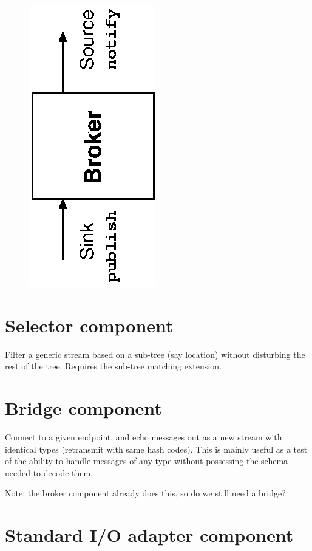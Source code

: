 \documentclass[12pt,a4paper,twoside]{article}
\renewcommand{\_}{\texttt{\symbol{95}}}
\begin{document}
\begin{figure}[ht]
\centering
\includegraphics[scale=1.0,angle=-90]{diagrams/broker.eps}
\end{figure}

\section{Selector component}

Filter a generic stream based on a sub-tree (say location)
without disturbing the rest of the tree. Requires the
sub-tree matching extension.

\section{Bridge component}

Connect to a given endpoint, and echo messages out as a new stream
with identical types (retransmit with same hash codes).
This is mainly useful as a test of the ability to handle messages
of any type without possessing the schema needed to decode them.

Note: the broker component already does this, so do we still need
a bridge?

\section{Standard I/O adapter component}
\end{document}
